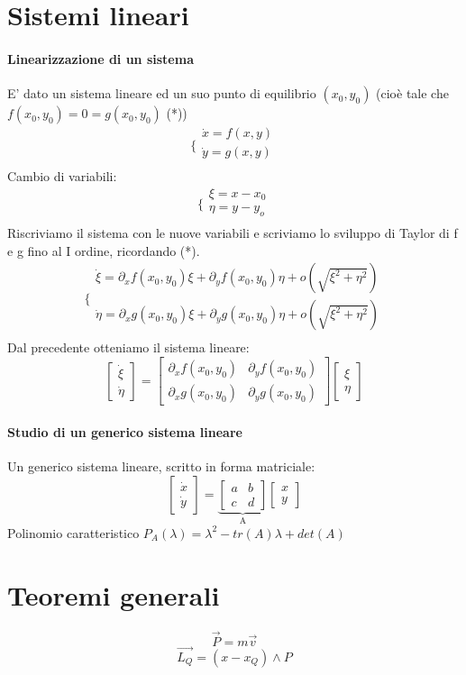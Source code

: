 \documentclass[a4paper,12pt]{article}
\begin{document}
\section{Sistemi lineari}
\paragraph{Linearizzazione di un sistema}
E' dato un sistema lineare ed un suo punto di equilibrio $(x_0,y_0)$ (cioè tale che $f(x_0,y_0)=0=g(x_0,y_0)$ (*))
$$\bigg\{ \begin{array}{l}
\dot{x} = f(x,y)\\
\dot{y} = g(x,y)\\
\end{array}$$
Cambio di variabili:
$$\bigg\{ \begin{array}{l}
\xi = x-x_0\\
\eta = y-y_o\\
\end{array}$$
Riscriviamo il sistema con le nuove variabili e scriviamo lo sviluppo di Taylor di f e g fino al I ordine, ricordando (*).
$$\bigg\{ \begin{array}{l}
\dot{\xi} = \partial_xf(x_0,y_0)\xi+\partial_yf(x_0,y_0)\eta + o(\sqrt{\xi^2+\eta^2})\\
\dot{\eta} = \partial_xg(x_0,y_0)\xi+\partial_yg(x_0,y_0)\eta + o(\sqrt{\xi^2+\eta^2})\\
\end{array}$$ 
Dal precedente otteniamo il sistema lineare: 
$$\begin{bmatrix}\dot{\xi} \\ \dot{\eta} \end{bmatrix} 
= \begin{bmatrix} \partial_xf(x_0,y_0) & \partial_yf(x_0,y_0) \\ \partial_xg(x_0,y_0) & \partial_yg(x_0,y_0) \end{bmatrix} \begin{bmatrix}\xi \\ \eta \end{bmatrix}
$$
\paragraph{Studio di un generico sistema lineare}
Un generico sistema lineare, scritto in forma matriciale:
$$\begin{bmatrix}\dot{x} \\ \dot{y} \end{bmatrix} 
=  \underbrace{\begin{bmatrix} a & b \\ c & d \end{bmatrix}}_\text{A}  \begin{bmatrix}x \\ y \end{bmatrix}
$$
Polinomio caratteristico $P_A(\lambda) = \lambda^2-tr(A)\lambda+det(A)$
\section{Teoremi generali}
\paragraph{}
$$
\vec{P} = m\vec{v}$$
$$
\vec{L_Q} = (x-x_Q)\wedge P
$$
\end{document}

